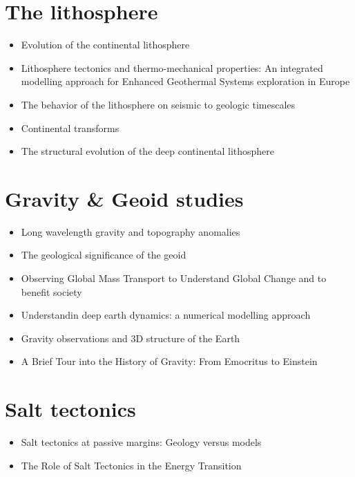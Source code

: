 \section{The lithosphere}
   \begin{itemize}
   \item [\twothousandfive] Evolution of the continental lithosphere \cite{slee05}
   \item [\twothousandten] Lithosphere tectonics and thermo-mechanical properties: An integrated modelling
         approach for Enhanced Geothermal Systems exploration in Europe \cite{clvz10}
   \item [\twothousandthirteen] The behavior of the lithosphere on seismic to geologic timescales \cite{wazh13}
   \item [\twothousandfourteen] Continental transforms \cite{noto14}
   \item [\twothousandseventeen] The structural evolution of the deep continental lithosphere \cite{comm17}
   \end{itemize}

\section{Gravity \& Geoid studies}
   \begin{itemize}
   \item Long wavelength gravity and topography anomalies \cite{wada81}
   \item The geological significance of the geoid \cite{chas85}
   \item Observing Global Mass Transport to Understand Global Change and to benefit society \cite{pabb15}
   \item Understandin deep earth dynamics: a numerical modelling approach \cite{siag17}
   \item Gravity observations and 3D structure of the Earth \cite{ricl06}
   \item A Brief Tour into the History of Gravity: From Emocritus to Einstein \cite{pamo13}
   \end{itemize}

\section{Salt tectonics}
   \begin{itemize}
   \item Salt tectonics at passive margins: Geology versus models \cite{brfo11}
   \item The Role of Salt Tectonics in the Energy Transition \cite{duhp23}
   \end{itemize}


